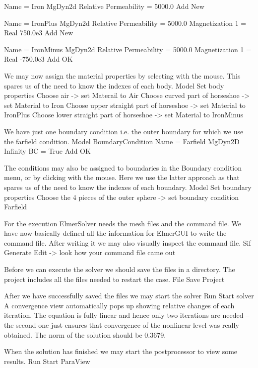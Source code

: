     Name = Iron
    MgDyn2d
      Relative Permeability = 5000.0
    Add
    New

    Name = IronPlus
    MgDyn2d
      Relative Permeability = 5000.0
      Magnetization 1 = Real 750.0e3
    Add
    New

    Name = IronMinus
    MgDyn2d
      Relative Permeability = 5000.0
      Magnetization 1 = Real -750.0e3
    Add
    OK
\ttend

We may now assign the material properties by selecting with the mouse.
This spares us of the 
need to know the indexes of each body.
\ttbegin
Model
  Set body properties
    Choose air -> set Materail to Air
    Choose curved part of horseshoe -> set Material to Iron
    Choose upper straight part of horseshoe -> set Material to IronPlus
    Choose lower straight part of horseshoe -> set Material to IronMinus
\ttend

We have just one boundary condition i.e. the outer boundary for which we use the farfield condition.
\ttbegin
Model
  BoundaryCondition
    Name = Farfield
    MgDyn2D
      Infinity BC = True
    Add
    OK
\ttend   

The conditions may also be assigned to boundaries in the Boundary condition menu, or 
by clicking with the mouse. Here we use the latter approach as that spares us of the 
need to know the indexes of each boundary.
\ttbegin
Model
  Set boundary properties
    Choose the 4 pieces of the outer sphere -> set boundary condition Farfield
\ttend

For the execution 
ElmerSolver needs the mesh files and the command file. We have now basically defined
all the information for ElmerGUI to write the command file. After writing it we may also visually 
inspect the command file.
\ttbegin
Sif 
  Generate
  Edit -> look how your command file came out  
\ttend

Before we can execute the solver we should save the files in a directory. The project includes
all the files needed to restart the case.
\ttbegin
File 
  Save Project
\ttend

After we have successfully saved the files we may start the solver
\ttbegin
Run
  Start solver
\ttend
A convergence view automatically pops up showing relative changes of each iteration.
The equation is fully linear and hence only two iterations are needed -- the second 
one just ensures that convergence of the nonlinear level was really obtained. 
The norm of the solution should be 0.3679.

When the solution has finished we may start the postprocessor to view some results.
\ttbegin
Run
  Start ParaView
\ttend



